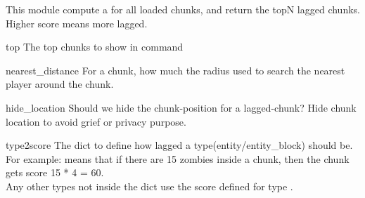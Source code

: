 This module compute a  for all loaded chunks, and return the topN lagged chunks.
Higher score means more lagged.


\begin{Configuration}
    \item[top]{
        The top chunks to show in  command
    }

    \item[nearest\_distance]{
        For a chunk, how much the radius used to search the nearest player around the chunk.
    }

    \item[hide\_location]{
        Should we hide the chunk-position for a lagged-chunk?
        Hide chunk location to avoid grief or privacy purpose.
    }

    \item[type2score]{
        The dict to define how lagged a type(entity/entity\_block) should be.\\
        For example:   means that if there are 15 zombies inside a chunk,
        then the chunk gets score 15 * 4 = 60.\\
        Any other types not inside the dict use the score defined for type .
    }

\end{Configuration}